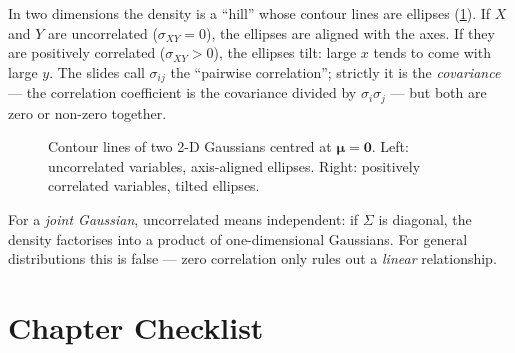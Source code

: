 \documentclass[11pt, oneside]{book}
\newcommand{\zeros}{\mathbf{0}}
\let\originalsection\section
\renewcommand{\section}{\Needspace{7\baselineskip}\originalsection}
\begin{document}
In two dimensions the density is a ``hill'' whose contour lines are ellipses
(\cref{fig:gauss2d}). If $X$ and $Y$ are uncorrelated ($\sigma_{XY} = 0$), the
ellipses are aligned with the axes. If they are positively correlated
($\sigma_{XY} > 0$), the ellipses tilt: large $x$ tends to come with large
$y$. The slides call $\sigma_{ij}$ the ``pairwise correlation''; strictly it
is the \emph{covariance} --- the correlation coefficient is the covariance
divided by $\sigma_i \sigma_j$ --- but both are zero or non-zero together.

\begin{figure}[htbp]
\centering
{}
\caption{Contour lines of two 2-D Gaussians centred at $\bm{\mu} = \zeros$.
Left: uncorrelated variables, axis-aligned ellipses. Right: positively
correlated variables, tilted ellipses.}
\label{fig:gauss2d}
\end{figure}

\begin{notebox}[title={Uncorrelated vs.\ independent}, unbreakable]
For a \emph{joint Gaussian}, uncorrelated means independent: if $\Sigma$ is
diagonal, the density factorises into a product of one-dimensional Gaussians.
For general distributions this is false --- zero correlation only rules out a
\emph{linear} relationship.
\end{notebox}

\section{Chapter Checklist}
\end{document}
